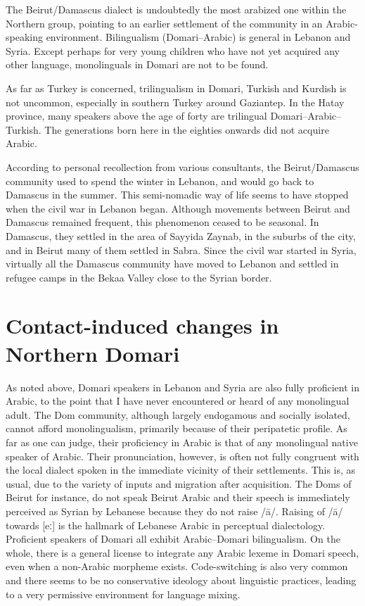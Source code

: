 \documentclass[output=paper]{langsci/langscibook}
\begin{document}
The Beirut/Damascus dialect is undoubtedly the most arabized one within the Northern group, pointing to an earlier settlement of the community in an Arabic-speaking environment. Bilingualism (Domari--Arabic) is general in Lebanon and Syria. Except perhaps for very young children who have not yet acquired any other language, monolinguals in Domari are not to be found.

As far as Turkey is concerned, trilingualism in Domari, Turkish and Kurdish is not uncommon, especially in southern Turkey around Gaziantep. In the Hatay province, many speakers above the age of forty are trilingual Domari--Arabic--Turkish. The generations born here in the eighties onwards did not acquire Arabic. 

According to personal recollection from various consultants, the Beirut/Damascus community used to spend the winter in Lebanon, and would go back to Damascus in the summer. This semi-nomadic way of life seems to have stopped when the civil war in Lebanon began. Although movements between Beirut and Damascus remained frequent, this phenomenon ceased to be seasonal. In Damascus, they settled in the area of Sayyida Zaynab, in the suburbs of the city, and in Beirut many of them settled in Sabra. Since the civil war started in Syria, virtually all the Damascus community have moved to Lebanon and settled in refugee camps in the Bekaa Valley close to the Syrian border. 

\section{Contact-induced changes in Northern Domari}

As noted above, Domari speakers in Lebanon and Syria are also fully proficient in Arabic, to the point that I have never encountered or heard of any monolingual adult. The Dom community, although largely endogamous and socially isolated, cannot afford monolingualism, primarily because of their peripatetic profile. As far as one can judge, their proficiency in Arabic is that of any monolingual native speaker of Arabic. Their pronunciation, however, is often not fully congruent with the local dialect spoken in the immediate vicinity of their settlements. This is, as usual, due to the variety of inputs and migration after acquisition. The Doms of Beirut for instance, do not speak Beirut Arabic and their speech is immediately perceived as Syrian by Lebanese because they do not raise /ā/. Raising of /ā/ towards [eː] is the hallmark of Lebanese Arabic in perceptual dialectology. Proficient speakers of Domari all exhibit Arabic--Domari bilingualism. On the whole, there is a general license to integrate any Arabic lexeme in Domari speech, even when a non-Arabic morpheme exists. Code-switching is also very common and there seems to be no conservative ideology about linguistic practices, leading to a very permissive environment for language mixing.
\end{document}

